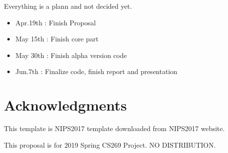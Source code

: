 \documentclass{article}
\begin{document}
Everything is a plann and not decided yet.

\begin{itemize}
  \item Apr.19th : Finish Proposal
  \item May 15th : Finish core part 
  \item May 30th : Finish alpha version code
  \item Jun.7th : Finalize code, finish report and presentation 
\end{itemize}


\section*{Acknowledgments}

This template is NIPS2017 template downloaded from NIPS2017 website.

This proposal is for 2019 Spring CS269 Project. NO DISTRIBUTION.



\end{document}
